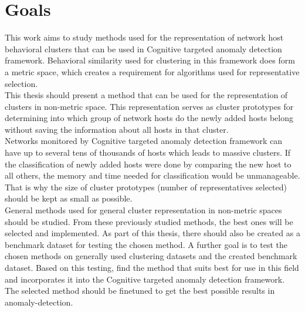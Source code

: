 \documentclass[thesis=B,english]{FITthesis}[2012/10/20]
\begin{document}
%

\chapter{Goals}

This work aims to study methods used for the representation of network host behavioral clusters that can be used in Cognitive targeted anomaly detection framework.
Behavioral similarity used for clustering in this framework does form a metric space, which creates a requirement for algorithms used for representative selection. \\
                                                                                  
This thesis should present a method that can be used for the representation of clusters in non-metric space.
This representation serves as cluster prototypes for determining into which group of network hosts do the newly added hosts belong without saving the information about all hosts in that cluster. \\

Networks monitored by Cognitive targeted anomaly detection framework can have up to several tens of thousands of hosts which leads to massive clusters.
If the classification of newly added hosts were done by comparing the new host to all others, the memory and time needed for classification would be unmanageable.
That is why the size of cluster prototypes (number of representatives selected) should be kept as small as possible. \\                                   
                                                                                  
General methods used for general cluster representation in non-metric spaces should be studied.
From these previously studied methods, the best ones will be selected and implemented.
As part of this thesis, there should also be created as a benchmark dataset for testing the chosen method.
A further goal is to test the chosen methods on generally used clustering datasets and the created benchmark dataset.
Based on this testing, find the method that suits best for use in this field and incorporates it into the Cognitive targeted anomaly detection framework.
The selected method should be finetuned to get the best possible results in anomaly-detection. 
\end{document}
